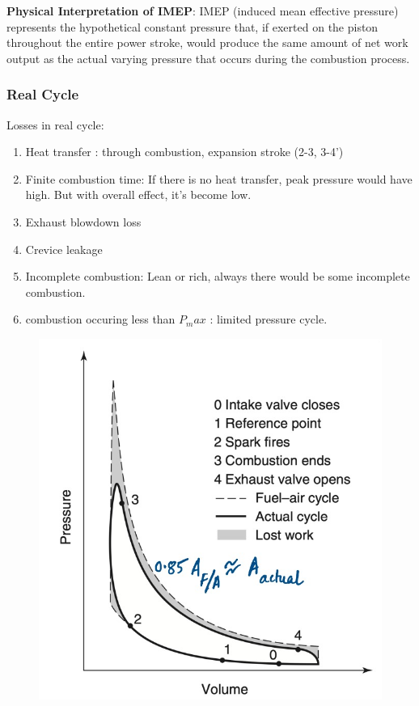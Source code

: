 \documentclass{article}
\begin{document}
\begin{multicols}{2}
		\textbf{Physical Interpretation of IMEP}: IMEP (induced mean effective pressure) represents the hypothetical constant pressure that, if exerted on the piston throughout the entire power stroke, would produce the same amount of net work output as the actual varying pressure that occurs during the combustion process.

		\subsubsection*{Real Cycle}
		Losses in real cycle:
		\begin{enumerate}
			\item Heat transfer : through combustion, expansion stroke (2-3, 3-4')
			\item Finite combustion time: If there is no heat transfer, peak pressure would have high. But with overall effect, it's become low. 
			\item Exhaust blowdown loss
			\item Crevice leakage 
			\item Incomplete combustion: Lean or rich, always there would be some incomplete combustion.
			\item combustion occuring less than $P_max$ : limited pressure cycle.
		\end{enumerate}

		\begin{figure}[H]
			\begin{center}
				\includegraphics[width=\linewidth]{img/real_cycle_loss.jpeg}
			\end{center}
		\end{figure}
	\end{multicols}
	\begin{center}
	\end{center}
\end{document}
